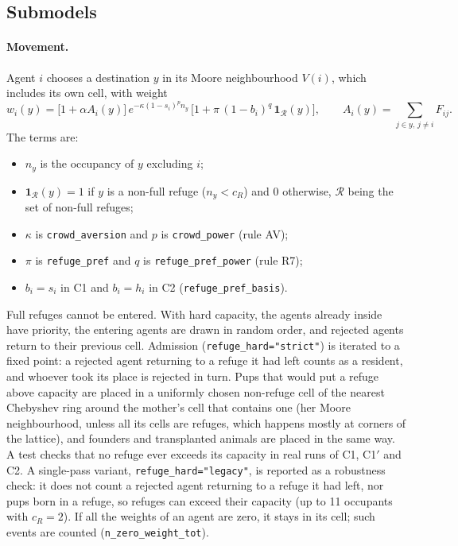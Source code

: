 \subsection{Submodels}
\paragraph{Movement.}
Agent $i$ chooses a destination $y$ in its Moore neighbourhood $V(i)$, which includes its own cell, with weight
\[
w_i(y)=\bigl[1+\alpha A_i(y)\bigr]\,
e^{-\kappa(1-s_i)^{p}n_y}\,
\bigl[1+\pi\,(1-b_i)^{q}\,\mathbf 1_{\mathcal R}(y)\bigr],
\qquad A_i(y)=\sum_{j\in y,\,j\ne i}F_{ij}.
\]
The terms are:
\begin{itemize}
\item $n_y$ is the occupancy of $y$ excluding $i$;
\item $\mathbf 1_{\mathcal R}(y)=1$ if $y$ is a non-full refuge ($n_y<c_R$) and 0 otherwise, $\mathcal R$ being the set of
  non-full refuges;
\item $\kappa$ is \texttt{crowd\_aversion} and $p$ is \texttt{crowd\_power} (rule AV);
\item $\pi$ is \texttt{refuge\_pref} and $q$ is \texttt{refuge\_pref\_power} (rule R7);
\item $b_i=s_i$ in \textsf{C1} and $b_i=h_i$ in \textsf{C2} (\texttt{refuge\_pref\_basis}).
\end{itemize}
Full refuges cannot be entered. With hard capacity, the agents already inside have priority, the entering agents are
drawn in random order, and rejected agents return to their previous cell. Admission (\texttt{refuge\_hard="strict"}) is iterated to a fixed
point: a rejected agent returning to a refuge it had left counts as a resident, and whoever took its place is
rejected in turn. Pups that would put a refuge
above capacity are placed in a uniformly chosen non-refuge cell of the nearest Chebyshev ring around the mother's
cell that contains one (her Moore neighbourhood, unless all its cells are refuges, which happens mostly at corners of
the lattice), and founders and transplanted animals are placed in the same way. A test checks that no refuge ever exceeds its capacity in real
runs of \textsf{C1}, \textsf{C1}$'$ and \textsf{C2}. A single-pass variant, \texttt{refuge\_hard="legacy"}, is
reported as a robustness check: it does not count a rejected agent returning to a refuge it had left, nor pups born in
a refuge, so refuges can exceed their capacity (up to 11 occupants with $c_R=2$). If all the weights of an agent are zero, it stays in its cell; such events are
counted (\texttt{n\_zero\_weight\_tot}).

